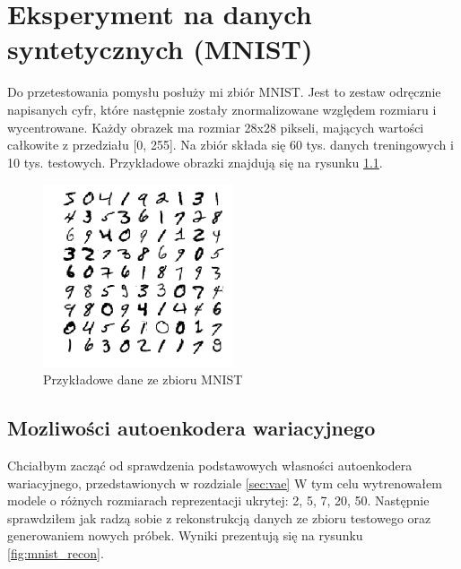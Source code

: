 \chapter{Eksperyment na danych syntetycznych (MNIST)}

Do przetestowania pomysłu posłuży mi zbiór MNIST. Jest to zestaw odręcznie napisanych cyfr, które następnie zostały znormalizowane względem rozmiaru i wycentrowane. Każdy obrazek ma rozmiar 28x28 pikseli, mających wartości całkowite z przedziału [0, 255]. Na zbiór składa się 60 tys. danych treningowych i 10 tys. testowych. Przykładowe obrazki znajdują się na rysunku \ref{fig:mnist}.

\begin{figure}[h!]
    \centering
    \includegraphics[width=0.5\textwidth]{images/mnist_v2}
    \caption{Przykładowe dane ze zbioru MNIST}
    \label{fig:mnist}
\end{figure}

\section{Mozliwości autoenkodera wariacyjnego} \label{sec:vae_oppo}

Chciałbym zacząć od sprawdzenia podstawowych własności autoenkodera wariacyjnego, przedstawionych w rozdziale \ref{sec:vae} W tym celu wytrenowałem modele o różnych rozmiarach reprezentacji ukrytej: 2, 5, 7, 20, 50. Następnie sprawdziłem jak radzą sobie z rekonstrukcją danych ze zbioru testowego oraz generowaniem nowych próbek. Wyniki prezentują się na rysunku \ref{fig:mnist_recon}. 

